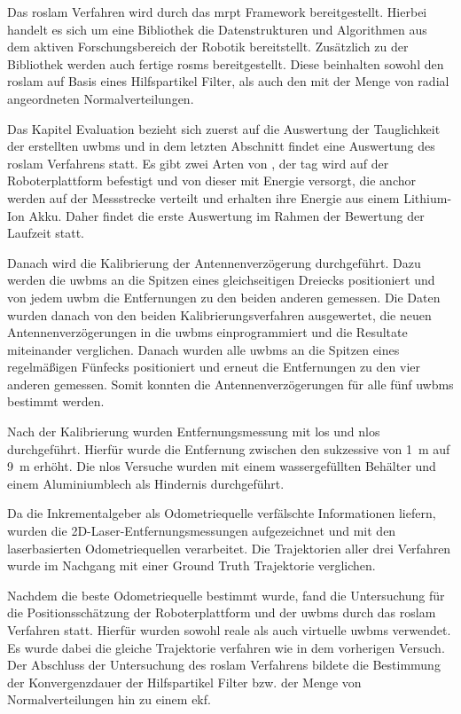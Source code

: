 Das \gls{roslam} Verfahren wird durch das \gls{mrpt} Framework bereitgestellt. Hierbei handelt es sich um eine Bibliothek die Datenstrukturen und Algorithmen aus dem aktiven Forschungsbereich der Robotik bereitstellt. Zusätzlich zu der Bibliothek werden auch fertige \glspl{rosm} bereitgestellt. Diese beinhalten sowohl den \gls{roslam} auf Basis eines Hilfspartikel Filter, als auch den mit der Menge von radial angeordneten Normalverteilungen.

Das Kapitel Evaluation bezieht sich zuerst auf die Auswertung der Tauglichkeit der erstellten \glspl{uwbm} und in dem letzten Abschnitt findet eine Auswertung des \gls{roslam} Verfahrens statt. Es gibt zwei Arten von , der \gls{tag} wird auf der Roboterplattform befestigt und von dieser mit Energie versorgt, die \gls{anchor} werden auf der Messstrecke verteilt und erhalten ihre Energie aus einem Lithium-Ion Akku. Daher findet die erste Auswertung im Rahmen der Bewertung der Laufzeit statt.

Danach wird die Kalibrierung der Antennenverzögerung durchgeführt. Dazu werden die \glspl{uwbm} an die Spitzen eines gleichseitigen Dreiecks positioniert und von jedem \gls{uwbm} die Entfernungen zu den beiden anderen  gemessen. Die Daten wurden danach von den beiden Kalibrierungsverfahren ausgewertet, die neuen Antennenverzögerungen in die \glspl{uwbm} einprogrammiert und die Resultate miteinander verglichen. Danach wurden alle \glspl{uwbm} an die  Spitzen eines regelmäßigen Fünfecks positioniert und erneut die Entfernungen zu den vier anderen  gemessen. Somit konnten die Antennenverzögerungen für alle fünf \glspl{uwbm} bestimmt werden.

Nach der Kalibrierung wurden Entfernungsmessung mit \gls{los} und \gls{nlos} durchgeführt. Hierfür wurde die Entfernung zwischen den  sukzessive von \SI{1}{\meter} auf \SI{9}{\meter} erhöht. Die \gls{nlos} Versuche wurden mit einem wassergefüllten Behälter und einem Aluminiumblech als Hindernis durchgeführt.

Da die Inkrementalgeber als Odometriequelle verfälschte Informationen liefern, wurden die 2D-Laser-Entfernungsmessungen aufgezeichnet und mit den laserbasierten Odometriequellen verarbeitet. Die Trajektorien aller drei Verfahren wurde im Nachgang mit einer Ground Truth Trajektorie verglichen.

Nachdem die beste Odometriequelle bestimmt wurde, fand die Untersuchung für die Positionsschätzung der Roboterplattform und der \glspl{uwbm} durch das \gls{roslam} Verfahren statt. Hierfür wurden sowohl reale als auch virtuelle \glspl{uwbm} verwendet. Es wurde dabei die gleiche Trajektorie verfahren wie in dem vorherigen Versuch. Der Abschluss der Untersuchung des \gls{roslam} Verfahrens bildete die Bestimmung der Konvergenzdauer der Hilfspartikel Filter bzw. der Menge von Normalverteilungen hin zu einem \gls{ekf}.


